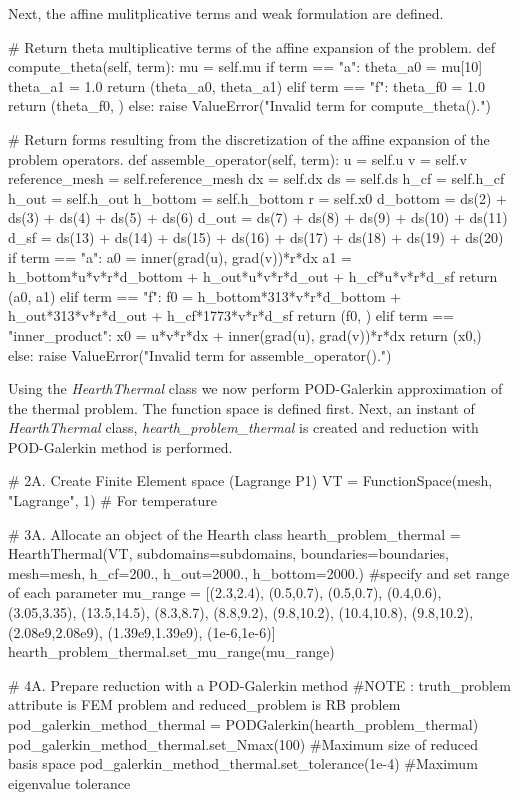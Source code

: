 Next, the affine mulitplicative terms and weak formulation are defined.
\begin{python}

	# Return theta multiplicative terms of the affine expansion of the problem.
	def compute_theta(self, term):
		mu = self.mu
		if term == "a":
			theta_a0 = mu[10]
			theta_a1 = 1.0
			return (theta_a0, theta_a1)
		elif term == "f":
			theta_f0 = 1.0
			return (theta_f0, )
		else:
			raise ValueError("Invalid term for compute_theta().")

	# Return forms resulting from the discretization of the affine expansion of the problem operators.
	def assemble_operator(self, term):
		u = self.u
		v = self.v
		reference_mesh = self.reference_mesh
		dx = self.dx
		ds = self.ds
		h_cf = self.h_cf
		h_out = self.h_out
		h_bottom = self.h_bottom
		r = self.x0
		d_bottom = ds(2) + ds(3) + ds(4) + ds(5) + ds(6)
		d_out = ds(7) + ds(8) + ds(9) + ds(10) + ds(11)
		d_sf = ds(13) + ds(14) + ds(15) + ds(16) + ds(17) + ds(18) + ds(19) + ds(20)
		if term == "a":
			a0 = inner(grad(u), grad(v))*r*dx
			a1 = h_bottom*u*v*r*d_bottom + h_out*u*v*r*d_out + h_cf*u*v*r*d_sf
			return (a0, a1)
		elif term == "f":
			f0 = h_bottom*313*v*r*d_bottom + h_out*313*v*r*d_out + h_cf*1773*v*r*d_sf
			return (f0, )
		elif term == "inner_product":
			x0 = u*v*r*dx + inner(grad(u), grad(v))*r*dx
			return (x0,)
		else:
			raise ValueError("Invalid term for assemble_operator().")
\end{python}

Using the \emph{HearthThermal} class we now perform POD-Galerkin approximation of the thermal problem. The function space is defined first. Next, an instant of \emph{HearthThermal} class, \emph{hearth\_problem\_thermal} is created and reduction with POD-Galerkin method is performed.
\begin{python}
# 2A. Create Finite Element space (Lagrange P1)
VT = FunctionSpace(mesh, "Lagrange", 1) # For temperature

# 3A. Allocate an object of the Hearth class
hearth_problem_thermal = HearthThermal(VT, subdomains=subdomains, boundaries=boundaries, mesh=mesh, h_cf=200., h_out=2000., h_bottom=2000.)
#specify and set range of each parameter
mu_range = [(2.3,2.4), (0.5,0.7), (0.5,0.7), (0.4,0.6), (3.05,3.35), (13.5,14.5), (8.3,8.7), (8.8,9.2), (9.8,10.2), (10.4,10.8), (9.8,10.2), (2.08e9,2.08e9), (1.39e9,1.39e9), (1e-6,1e-6)]
hearth_problem_thermal.set_mu_range(mu_range)

# 4A. Prepare reduction with a POD-Galerkin method
#NOTE : truth_problem attribute is FEM problem and reduced_problem is RB problem
pod_galerkin_method_thermal = PODGalerkin(hearth_problem_thermal)
pod_galerkin_method_thermal.set_Nmax(100) #Maximum size of reduced basis space
pod_galerkin_method_thermal.set_tolerance(1e-4) #Maximum eigenvalue tolerance
\end{python}

